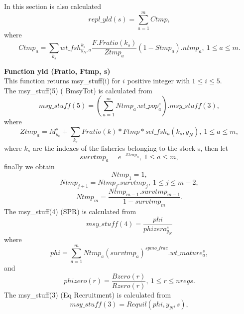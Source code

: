 \documentclass{article}
\begin{document}
In this section is also calculated
\begin{equation}
    repl\_yld(s)=\sum_{a=1}^m Ctmp,
\end{equation}
where
\begin{equation}
    Ctmp_a=\sum_{k_s} wt\_fsh^{k_s}_{y_N,a}\dfrac{F.Fratio(k_s)}{Ztmp_a}(1-Stmp_a).ntmp_a, \ 1\leq a \leq m.
\end{equation}

\textbf{Function yld (Fratio, Ftmp, s)}\\

This function returns msy\_stuff(i) for $i$ positive integer with $1\leq i \leq 5$. \\
The msy\_stuff(5) ( BmsyTot) is calculated from
\begin{equation}
    msy\_stuff(5)=\left(\sum_{a=1}^m Ntmp_a.wt\_pop^s_a\right).msy\_stuff(3),
\end{equation}
where
\begin{equation}
    Ztmp_a=M^s_{y_0}+\sum_{k_s}Fratio(k)*Ftmp*sel\_fsh_a(k_s,y_N), \ 1\leq a \leq m, 
\end{equation}
where $k_s$ are the indexes of the fisheries belonging to the stock s, then let
\begin{equation}
    survtmp_a=e^{-Ztmp_a}, \ 1\leq a \leq m,
\end{equation}
finally we obtain
\begin{equation}
    Ntmp_1=1,
\end{equation}
\begin{equation}
    Ntmp_{j+1}=Ntmp_j.survtmp_j, \ 1\leq j \leq m-2,
\end{equation}
\begin{equation}
    Ntmp_m=\dfrac{Ntmp_{m-1}.survtmp_{m-1}}{1-survtmp_m}.
\end{equation}
The msy\_stuff(4) (SPR) is calculated from
\begin{equation}
    msy\_stuff(4)=\dfrac{phi}{phizero^s_{y_N}}
\end{equation}
where 
\begin{equation}
    phi= \sum_{a=1}^m Ntmp_a(survtmp_a)^{spmo\_frac}.wt\_mature^s_a,
\end{equation}
and 
\begin{equation}
    phizero(r)=\dfrac{Bzero(r)}{Rzero(r)}, \ 1\leq r \leq nregs.
\end{equation}
The msy\_stuff(3) (Eq Recruitment) is calculated from
\begin{equation}
    msy\_stuff(3)  = Requil(phi,y_N,s),
\end{equation}
\end{document}
